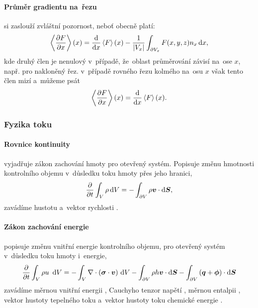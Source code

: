 \paragraph{Průměr gradientu na~řezu} si zaslouží zvláštní pozornost, neboť obecně platí:
\begin{equation}
    \left\langle\frac{\partial F}{\partial x}\right\rangle (x)=\frac{\mathrm{d} }{\mathrm{d} x}\left\langle F \right\rangle (x)-\frac{1}{\left\lvert V_x\right\rvert}\int_{\partial V_x} F(x,y,z) n_x \,\mathrm{d}{x},
\end{equation}
kde druhý člen je nenulový v~případě, že~oblast průměrování závisí na~ose $x$, např. pro nakloněný řez. v~případě rovného řezu kolmého na~osu $x$ však tento člen mizí a~můžeme psát
\begin{equation}
    \left\langle\frac{\partial F}{\partial x}\right\rangle (x)=\frac{\mathrm{d} }{\mathrm{d} x}\left\langle F \right\rangle (x).
\end{equation}

\subsubsection{Fyzika toku}\label{sss:fyzika_toku}
\paragraph{Rovnice kontinuity} vyjadřuje zákon zachování hmoty pro otevřený systém. Popisuje změnu hmotnosti kontrolního objemu v~důsledku toku hmoty přes jeho hranici,
\begin{equation} \label{eq:continuity_integral}
\frac{\partial }{\partial t}\int_V \rho \,\mathrm{d}{V} = - \int_{\partial V} \rho \bm{v} \cdot \mathrm{d}\bm{S},
\end{equation}
zavádíme hustotu \Unit{\rho}{\kilogram\per\cubic\meter} a~vektor rychlosti . 

\paragraph{Zákon zachování energie} popisuje změnu vnitřní energie kontrolního objemu, pro otevřený systém v~důsledku toku hmoty i~energie,
\begin{equation}\label{eq:first_law_thermodynamics}
    \frac{\partial }{\partial t}\int_{V}\rho u~\,\mathrm{d}{V}
    = - \int_{V}\nabla \cdot \left(\bm{\sigma}\cdot\bm{v}\right) \,\mathrm{d}{V}
    - \int_{\partial V} \rho h \bm{v} \cdot \mathrm{d}\bm{S}
    - \int_{\partial V}\left(\bm{q}+\bm{\phi}\right)\cdot \mathrm{d}\bm{S}
\end{equation}
zavádíme měrnou vnitřní energii , Cauchyho tenzor napětí \Unit{\bm{\sigma}}{\pascal}, měrnou entalpii , vektor hustoty tepelného toku  a~vektor hustoty toku chemické energie \Unit{\bm{\phi}}{\watt\per\square\meter}. 

